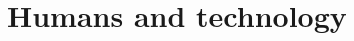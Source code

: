 \chapter{Humans and technology} \label{chap:humans_and_technology}
\todo

\vfill \minitoc \newpage





